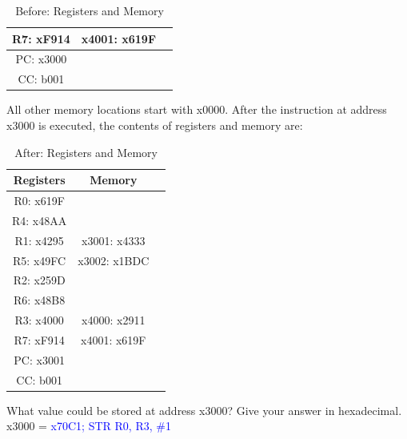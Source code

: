 \documentclass{article}
\begin{document}
\begin{enumerate}[label=(\alph*)]
\begin{enumerate}[label=(\roman*)]
\begin{table}[h]
\begin{tabular}{|c|c|c|}
            R7: xF914 & x4001: x619F & \\
            \hline
            PC: x3000 & & \\
            \hline
            CC: b001 & & \\
            \hline
            \end{tabular}
            \caption{Before: Registers and Memory}
            \end{table}
            \newline
            All other memory locations start with x0000. After the instruction at address x3000 is executed, the contents of registers and memory are:
            \begin{table}[h]
            \centering
            \begin{tabular}{|c|c|c|}
            \hline
            \textbf{Registers} & \textbf{Memory} & \\
            \hline
            R0: x619F & & \\
            \hline
            R4: x48AA & & \\
            \hline
            R1: x4295 & x3001: x4333 & \\
            \hline
            R5: x49FC & x3002: x1BDC & \\
            \hline
            R2: x259D & & \\
            \hline
            R6: x48B8 & & \\
            \hline
            R3: x4000 & x4000: x2911 & \\
            \hline
            R7: xF914 & x4001: x619F & \\
            \hline
            PC: x3001 & & \\
            \hline
            CC: b001 & & \\
            \hline
            \end{tabular}
            \caption{After: Registers and Memory}
            \end{table}
            \newline
            What value could be stored at address x3000? Give your answer in hexadecimal.
            \newline
            \newline
            x3000 = \textcolor{blue}{x70C1; STR R0, R3, \#1}
        \end{enumerate}
        \newpage
    \end{enumerate}
\end{document}

